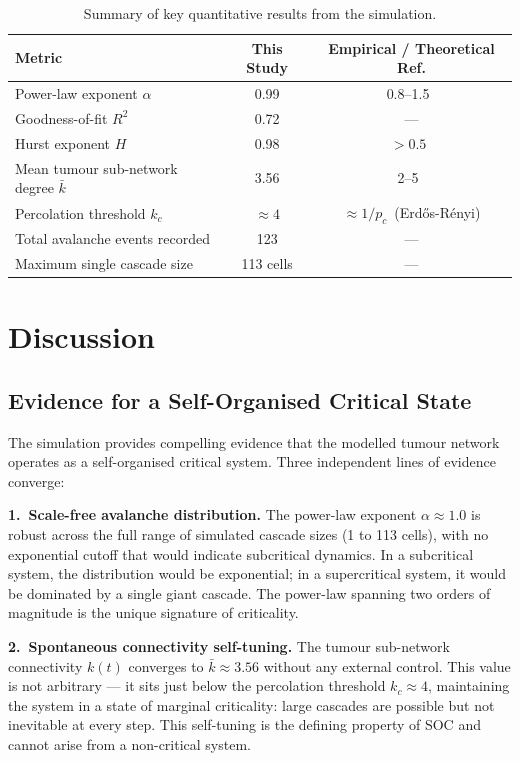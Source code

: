 \documentclass[12pt,a4paper]{article}
\begin{document}
\begin{table}[H]
\centering
\caption{Summary of key quantitative results from the simulation.}
\label{tab:results}
\renewcommand{\arraystretch}{1.25}
\begin{tabular}{lcc}
\toprule
\textbf{Metric} & \textbf{This Study} & \textbf{Empirical / Theoretical Ref.} \\
\midrule
Power-law exponent $\alpha$ & 0.99 & 0.8--1.5\ \citep{goh2003sandpile} \\
Goodness-of-fit $R^2$ & 0.72 & --- \\
Hurst exponent $H$ & 0.98 & $>0.5$\ \citep{plenz2014criticality} \\
Mean tumour sub-network degree $\bar{k}$ & 3.56 & 2--5\ \citep{barabasi2011network} \\
Percolation threshold $k_c$ & $\approx 4$ & $\approx 1/p_c$\ (Erd\H{o}s-R\'{e}nyi) \\
Total avalanche events recorded & 123 & --- \\
Maximum single cascade size & 113 cells & --- \\
\bottomrule
\end{tabular}
\end{table}

\section{Discussion}
\label{sec:discussion}

\subsection{Evidence for a Self-Organised Critical State}

The simulation provides compelling evidence that the modelled tumour network
operates as a self-organised critical system.  Three independent lines of
evidence converge:

\textbf{1.\ Scale-free avalanche distribution.}
The power-law exponent $\alpha \approx 1.0$ is robust across the full range of
simulated cascade sizes (1 to 113 cells), with no exponential cutoff that would
indicate subcritical dynamics.  In a subcritical system, the distribution would
be exponential; in a supercritical system, it would be dominated by a single
giant cascade.  The power-law spanning two orders of magnitude is the unique
signature of criticality.

\textbf{2.\ Spontaneous connectivity self-tuning.}
The tumour sub-network connectivity $k(t)$ converges to $\bar{k} \approx 3.56$
without any external control.  This value is not arbitrary --- it sits just
below the percolation threshold $k_c \approx 4$, maintaining the system in a
state of marginal criticality: large cascades are possible but not inevitable
at every step.  This self-tuning is the defining property of SOC and cannot
arise from a non-critical system.
\end{document}
